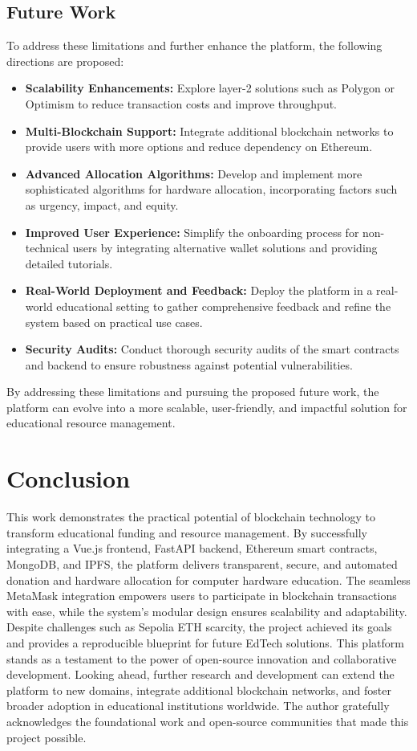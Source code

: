 \documentclass[a4paper,12pt]{report}
\newcommand{\mychapter}[2]{
    \setcounter{chapter}{#1}
    \setcounter{section}{0}
    \setcounter{table}{0}
    \setcounter{figure}{0}
    \chapter*{#2}
    \addcontentsline{toc}{chapter}{#2}
}
\begin{document}
\section{Future Work}
To address these limitations and further enhance the platform, the following directions are proposed:
\begin{itemize}
    \item \textbf{Scalability Enhancements:} Explore layer-2 solutions such as Polygon or Optimism to reduce transaction costs and improve throughput.
    \item \textbf{Multi-Blockchain Support:} Integrate additional blockchain networks to provide users with more options and reduce dependency on Ethereum.
    \item \textbf{Advanced Allocation Algorithms:} Develop and implement more sophisticated algorithms for hardware allocation, incorporating factors such as urgency, impact, and equity.
    \item \textbf{Improved User Experience:} Simplify the onboarding process for non-technical users by integrating alternative wallet solutions and providing detailed tutorials.
    \item \textbf{Real-World Deployment and Feedback:} Deploy the platform in a real-world educational setting to gather comprehensive feedback and refine the system based on practical use cases.
    \item \textbf{Security Audits:} Conduct thorough security audits of the smart contracts and backend to ensure robustness against potential vulnerabilities.
\end{itemize}

By addressing these limitations and pursuing the proposed future work, the platform can evolve into a more scalable, user-friendly, and impactful solution for educational resource management.

\mychapter{8}{Conclusion}
This work demonstrates the practical potential of blockchain technology to transform educational funding and resource management. By successfully integrating a Vue.js frontend, FastAPI backend, Ethereum smart contracts, MongoDB, and IPFS, the platform delivers transparent, secure, and automated donation and hardware allocation for computer hardware education. The seamless MetaMask integration empowers users to participate in blockchain transactions with ease, while the system’s modular design ensures scalability and adaptability. Despite challenges such as Sepolia ETH scarcity, the project achieved its goals and provides a reproducible blueprint for future EdTech solutions. This platform stands as a testament to the power of open-source innovation and collaborative development. Looking ahead, further research and development can extend the platform to new domains, integrate additional blockchain networks, and foster broader adoption in educational institutions worldwide. The author gratefully acknowledges the foundational work and open-source communities that made this project possible.
\end{document}
